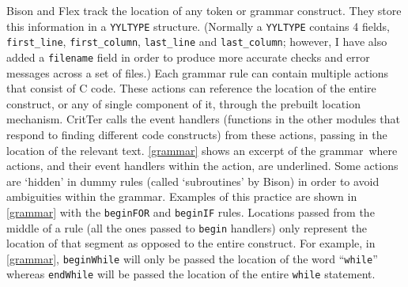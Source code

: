 \documentclass[12pt]{report}
\newcommand{\programName}{CritTer\xspace}
\begin{document}
Bison and Flex track the location of any token or grammar construct. They store this information in a 
\lstinline{YYLTYPE} structure. (Normally a \lstinline{YYLTYPE} contains 4 fields, \lstinline{first_line}, 
\lstinline{first_column}, \lstinline{last_line} and \lstinline{last_column}; however, I have also added a 
\lstinline{filename} field in order to produce more accurate checks and error messages across a set of 
files.) Each grammar rule can contain multiple actions that consist of C code. These actions can 
reference the location of the entire construct, or any of single component of it, through the prebuilt 
location mechanism. \programName calls the event handlers (functions in the other modules that 
respond to finding different code constructs) from these actions, passing in the location of the relevant 
text.  \autoref{grammar} shows an excerpt of the grammar\ where actions, and their event handlers within 
the action, are underlined. Some actions are `hidden' in dummy rules (called `subroutines' by Bison) in 
order to avoid ambiguities within the grammar. Examples of this practice are shown in \autoref{grammar} 
with the \lstinline{beginFOR} and \lstinline{beginIF} rules. Locations passed from the middle of a rule (all 
the ones passed to \lstinline{begin} handlers) only represent the location of that segment as opposed to 
the entire construct. For example, in \autoref{grammar}, \lstinline{beginWhile} will only be passed the 
location of the word ``\lstinline{while}'' whereas \lstinline{endWhile} will be passed the location of the 
entire \lstinline{while} statement.
\end{document}
